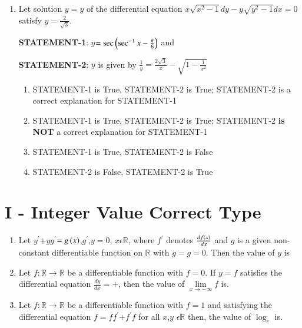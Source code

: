 \documentclass[journal]{IEEEtran}
\begin{document}
\begin{enumerate}
\item Let solution $y=y$ of the differential equation $x\sqrt{x^2-1}dy-y\sqrt{y^2-1}dx=0$ satisfy $y$$=\frac{2}{\sqrt3}$.

	\textbf{STATEMENT-1}: $y$$=\sec{\ensuremath{\left(\sec^{-1}{x}-\frac{\pi}{6}\right)}}$ and 

\textbf{STATEMENT-2}: $y$ is given by $\frac{1}{y}=\frac{2\sqrt3}{x}-\sqrt{1-\frac{1}{x^2}}$
\hfill{}
\begin{enumerate}
\item STATEMENT-1 is True, STATEMENT-2 is True; STATEMENT-2 is a correct explanation for STATEMENT-1
\item STATEMENT-1 is True, STATEMENT-2 is True; STATEMENT-2 \textbf{is NOT} a correct explanation for STATEMENT-1
\item STATEMENT-1 is True, STATEMENT-2 is False
\item STATEMENT-2 is False, STATEMENT-2 is True
\end{enumerate}
\end{enumerate}

\section{I - Integer Value Correct Type}

\begin{enumerate}
	\item Let $y^{\prime}$$+y$$g^{\prime}$$=g\left(x\right)$,$g^{\prime}$,$y$$=0$, $x\epsilon\mathbb{R}$, where $f^{\prime}$ denotes $\frac{{df\left(x\right)}}{dx}$ and $g$ is a given non-constant differentiable function on $\mathbb{R}$ with $g$$=g$$=0$. Then the value of $y$ is 
		\hfill{}

\item Let $f:\mathbb{R}\to\mathbb{R}$ be a differentiable function with $f$$=0$. If $y=f$ satisfies the differential equation $\frac{dy}{dx}=$$+$, then the value of $\lim\limits_{x\to-\infty}f$ is. 
	\hfill{}

	\item Let $f:\mathbb{R}\to\mathbb{R}$ be a differentiable function with $f$$=1$ and satisfying the differential equation $f$$=f$$f^{\prime}$$+f^{\prime}$$f$ for all $x$,$y$ $\epsilon \mathbb{R}$ then, the value of $\log_e$  is. 
		\hfill{}

\end{enumerate}
\end{document}
